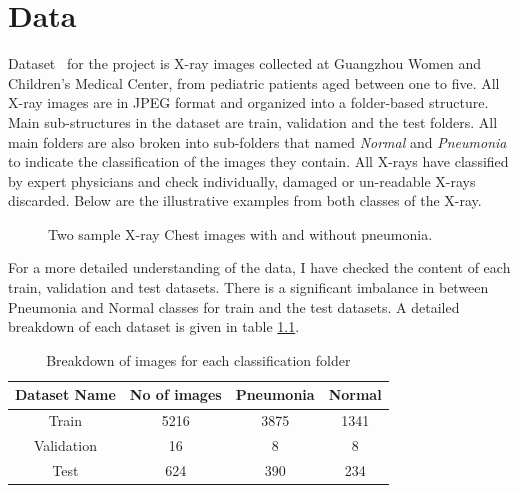\chapter{Data} \label{chap:data}
Dataset~\cite{dataset} for the project is X-ray images collected at Guangzhou Women and Children’s Medical Center, from pediatric patients aged between one to five.
All X-ray images are in JPEG format and organized into a folder-based structure.
Main sub-structures in the dataset are train, validation and the test folders.
All main folders are also broken into sub-folders that named \emph{Normal} and \emph{Pneumonia} to indicate the classification of the images they contain.
All X-rays have classified by expert physicians and check individually, damaged or un-readable X-rays discarded.
Below are the illustrative examples from both classes of the X-ray.

\begin{figure}[H]%
    \centering
    \qquad
    \caption{Two sample X-ray Chest images with and without pneumonia.}%
    \label{fig:sample}%
\end{figure}

For a more detailed understanding of the data, I have checked the content of each train, validation and test datasets. 
There is a significant imbalance in between Pneumonia and Normal classes for train and the test datasets.
A detailed breakdown of each dataset is given in table \ref{table:dataset}.


\begin{table}[H]
    \centering
    \begin{tabular}{||c c c c||} 
    \hline
    Dataset Name & No of images & Pneumonia & Normal \\ [0.5ex] 
    \hline\hline
    Train & 5216 & 3875 & 1341 \\ 
    \hline
    Validation & 16 & 8 & 8 \\
    \hline
    Test & 624 & 390 & 234 \\ [1ex] 
    \hline
    \end{tabular}
    \caption{Breakdown of images for each classification folder}
    \label{table:dataset}
\end{table}



